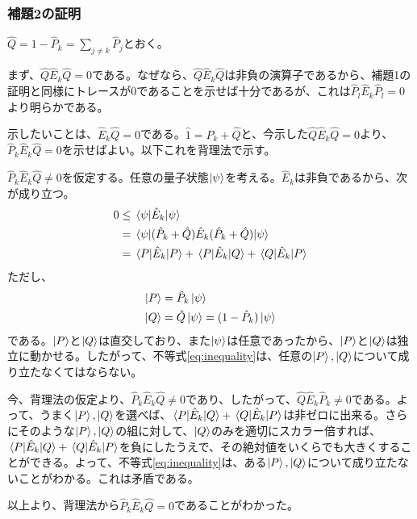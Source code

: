 \documentclass[uplatex,dvipdfmx, a4j]{jsarticle}
\newcommand{\ope}[1]{\hat{#1}}
\newcommand{\proj}{\ope{P}}
\begin{document}
\subsubsection{補題2の証明}
$\ope{Q} = 1-\proj_k = \sum_{j\neq k} \proj_j$とおく。

まず、$\ope{Q}\ope{E}_k\ope{Q} = 0$である。なぜなら、$\ope{Q}\ope{E}_k\ope{Q}$は非負の演算子であるから、補題1の証明と同様にトレースが0であることを示せば十分であるが、これは$\proj_l\ope{E}_k\proj_l = 0$より明らかである。

示したいことは、$\ope{E}_k\ope{Q}=0$である。$\ope{1} = \proj_k + \ope{Q}$と、今示した$\ope{Q}\ope{E}_k\ope{Q} = 0$より、 $\proj_k \ope{E}_k \ope{Q}=0$を示せばよい。以下これを背理法で示す。

$\proj_k \ope{E}_k \ope{Q}\neq0$を仮定する。任意の量子状態$\ket{\psi}$を考える。$\ope{E}_k$は非負であるから、次が成り立つ。
\begin{align}
	0 &\le \expval*{\ope{E}_k}{\psi} \\
	  &= \matrixelement*{\psi}{(\proj_k + \ope{Q})\ope{E}_k(\proj_k + \ope{Q})}{\psi} \\
	  &= \matrixelement*{P}{\ope{E}_k}{P} + \matrixelement*{P}{\ope{E}_k}{Q} + \matrixelement*{Q}{\ope{E}_k}{P} \label{eq:inequality}
\end{align}
ただし、
\begin{align}
	\ket{P} &= \proj_k \ket{\psi} \\
	\ket{Q} &= \ope{Q} \ket{\psi} = (1-\proj_k) \ket{\psi}
\end{align}
である。$\ket{P}$と$\ket{Q}$は直交しており、また$\ket{\psi}$は任意であったから、$\ket{P}$と$\ket{Q}$は独立に動かせる。したがって、不等式\eqref{eq:inequality}は、任意の$\ket{P},\ket{Q}$について成り立たなくてはならない。

今、背理法の仮定より、$\proj_k \ope{E}_k \ope{Q}\neq0$であり、したがって、$\ope{Q}\ope{E}_k\proj_k\neq0$である。よって、うまく$\ket{P},\ket{Q}$を選べば、$\matrixelement*{P}{\ope{E}_k}{Q} + \matrixelement*{Q}{\ope{E}_k}{P}$は非ゼロに出来る。さらにそのような$\ket{P},\ket{Q}$の組に対して、$\ket{Q}$のみを適切にスカラー倍すれば、$\matrixelement*{P}{\ope{E}_k}{Q} + \matrixelement*{Q}{\ope{E}_k}{P}$を負にしたうえで、その絶対値をいくらでも大きくすることができる。よって、不等式\eqref{eq:inequality}は、ある$\ket{P},\ket{Q}$について成り立たないことがわかる。これは矛盾である。

以上より、背理法から$\proj_k \ope{E}_k \ope{Q}=0$であることがわかった。
\end{document}
